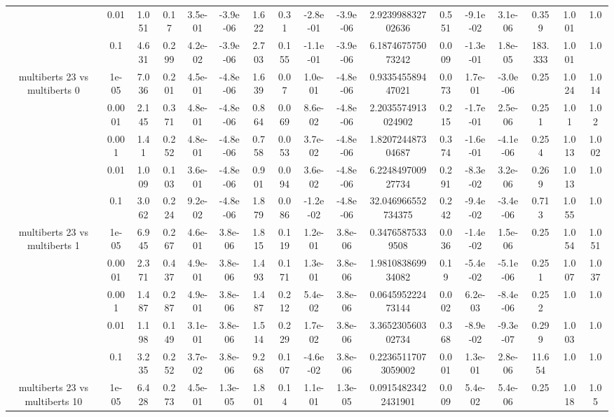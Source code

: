 \begin{tabular}{|c|c|c|c|c|c|c|c|c|c|c|c|c|c|c|c|c|}
 & 0.01 & 1.051 & 0.17 & 3.5e-01 & -3.9e-06 & 1.622 & 0.31 & -2.8e-01 & -3.9e-06 & 2.923998832702636 & 0.551 & -9.1e-02 & 3.1e-06 & 0.359 & 1.001 & 1.0 \\
 & 0.1 & 4.631 & 0.299 & 4.2e-02 & -3.9e-06 & 2.703 & 0.155 & -1.1e-01 & -3.9e-06 & 6.187467575073242 & 0.009 & -1.3e-01 & 1.8e-05 & 183.333 & 1.001 & 1.0 \\
\hline
\multirow{5}{*}{multiberts 23 vs multiberts 0} & 1e-05 & 7.036 & 0.201 & 4.5e-01 & -4.8e-06 & 1.639 & 0.07 & 1.0e-01 & -4.8e-06 & 0.933545589447021 & 0.073 & 1.7e-01 & -3.0e-06 & 0.25 & 1.024 & 1.014 \\
 & 0.0001 & 2.145 & 0.371 & 4.8e-01 & -4.8e-06 & 0.864 & 0.069 & 8.6e-02 & -4.8e-06 & 2.2035574913024902 & 0.215 & -1.7e-01 & 2.5e-06 & 0.251 & 1.01 & 1.02 \\
 & 0.001 & 1.41 & 0.252 & 4.8e-01 & -4.8e-06 & 0.758 & 0.053 & 3.7e-02 & -4.8e-06 & 1.820724487304687 & 0.374 & -1.6e-01 & -4.1e-06 & 0.254 & 1.013 & 1.002 \\
 & 0.01 & 1.009 & 0.103 & 3.6e-01 & -4.8e-06 & 0.901 & 0.094 & 3.6e-02 & -4.8e-06 & 6.224849700927734 & 0.291 & -8.3e-02 & 3.2e-06 & 0.269 & 1.013 & 1.0 \\
 & 0.1 & 3.062 & 0.224 & 9.2e-02 & -4.8e-06 & 1.879 & 0.086 & -1.2e-02 & -4.8e-06 & 32.046966552734375 & 0.242 & -9.4e-02 & -3.4e-06 & 0.713 & 1.055 & 1.0 \\
\hline
\multirow{5}{*}{multiberts 23 vs multiberts 1} & 1e-05 & 6.945 & 0.267 & 4.6e-01 & 3.8e-06 & 1.815 & 0.119 & 1.2e-01 & 3.8e-06 & 0.34765875339508 & 0.036 & -1.4e-02 & 1.5e-06 & 0.25 & 1.054 & 1.051 \\
 & 0.0001 & 2.371 & 0.437 & 4.9e-01 & 3.8e-06 & 1.493 & 0.171 & 1.3e-01 & 3.8e-06 & 1.981083869934082 & 0.19 & -5.4e-02 & -5.1e-06 & 0.251 & 1.007 & 1.037 \\
 & 0.001 & 1.487 & 0.287 & 4.9e-01 & 3.8e-06 & 1.487 & 0.212 & 5.4e-02 & 3.8e-06 & 0.064595222473144 & 0.002 & 6.2e-03 & -8.4e-06 & 0.252 & 1.0 & 1.0 \\
 & 0.01 & 1.198 & 0.149 & 3.1e-01 & 3.8e-06 & 1.514 & 0.229 & 1.7e-02 & 3.8e-06 & 3.365230560302734 & 0.368 & -8.9e-02 & -9.3e-07 & 0.299 & 1.003 & 1.0 \\
 & 0.1 & 3.235 & 0.252 & 3.7e-02 & 3.8e-06 & 9.268 & 0.107 & -4.6e-02 & 3.8e-06 & 0.22365117073059002 & 0.001 & 1.3e-01 & 2.8e-06 & 11.654 & 1.0 & 1.0 \\
\hline
\multirow{5}{*}{multiberts 23 vs multiberts 10} & 1e-05 & 6.428 & 0.273 & 4.5e-01 & 1.3e-05 & 1.801 & 0.14 & 1.1e-01 & 1.3e-05 & 0.09154823422431901 & 0.009 & 5.4e-02 & 5.4e-06 & 0.25 & 1.018 & 1.05 \\

\end{tabular}
